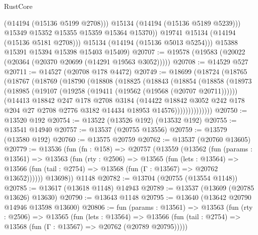 \begin{lexlean}{RustCore}
\begin{coremodule}
                  (@14194 (@15136 @5199 @2708)))
                @15134
                (@14194 (@15136 @5189 @5239)))
              @15349
              @15352
              @15355
              @15359
              @15364
              @15370))
          @19741
          @15134
          (@14194 (@15136 @5181 @2708)))
        @15134
        (@14194 (@15136 @5013 @5254)))
      @15388
      @15391
      @15394
      @15398
      @15403
      @15409)
@20707 := @19578 (@19583 (@20022 (@20364 (@20370 @20699 (@14291 @19563 @3052)))))
@20708 := @14529 @527
@20711 := @14527 (@20708 @178 @4472)
@20749 := @18699
    (@18724
      (@18765
        (@18767
          (@18769
            (@18790
              (@18808
                (@18825
                  (@18843
                    (@18854
                      (@18858
                        (@18973
                          (@18985
                            (@19107 (@19258 (@19411 (@19562 (@19568 (@20707 @20711))))))
                            (@14413
                              @18842
                              @247
                              @178
                              @2708
                              @3184
                              (@14422
                                @18842
                                @3052
                                @242
                                @178
                                @204
                                @27
                                @2708
                                @2776
                                @3182
                                @14434
                                @18953
                                @14576))))))))))))))
@20750 := @13520 @192
@20754 := @13522 (@13526 @192) (@13532 @192)
@20755 := @13541 @14940
@20757 := @13537 (@20755 @13556)
@20759 := @13579 (@13580 @192)
@20760 := @13575 @20759
@20762 := @13537 (@20760 @13605)
@20779 := @13536
    (fun (fn : @158) =>
    @20757
      (@13559
        (@13562
          (fun (params : @13561) =>
          @13563
            (fun (rty : @2506) =>
            @13565
              (fun (lets : @13564) =>
              @13566 (fun (tail : @2754) => @13568 (fun (Γ : @13567) => @20762 @13652))))))
        @13698))
    @1148
@20782 := @13704 (@20755 (@13554 @1148))
@20785 := @13617 (@13618 @1148) @14943
@20789 := @13537 (@13609 (@20785 @13626) @13630)
@20790 := @13643 @1148
@20795 := @13640 (@13642 @20790 @14946 @13598 @13600)
@20806 := fun (params : @13561) =>
  @13563
    (fun (rty : @2506) =>
    @13565
      (fun (lets : @13564) =>
      @13566 (fun (tail : @2754) => @13568 (fun (Γ : @13567) => @20762 (@20789 @20795)))))

\end{coremodule}
\end{lexlean}
